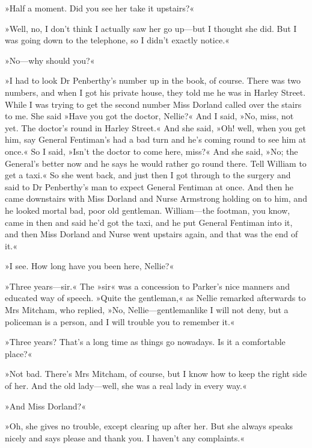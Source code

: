 »Half a moment. Did you see her take it upstairs?«

»Well, no, I don't think I actually saw her go up\allowbreak---\allowbreak but I thought she did. But I was going down to the telephone, so I didn't exactly notice.«

»No\allowbreak---\allowbreak why should you?«

»I had to look Dr Penberthy's number up in the book, of course. There was two numbers, and when I got his private house, they told me he was in Harley Street. While I was trying to get the second number Miss Dorland called over the stairs to me. She said »Have you got the doctor, Nellie?« And I said, »No, miss, not yet. The doctor's round in Harley Street.« And she said, »Oh! well, when you get him, say General Fentiman's had a bad turn and he's coming round to see him at once.« So I said, »Isn't the doctor to come here, miss?« And she said, »No; the General's better now and he says he would rather go round there. Tell William to get a taxi.« So she went back, and just then I got through to the surgery and said to Dr Penberthy's man to expect General Fentiman at once. And then he came downstairs with Miss Dorland and Nurse Armstrong holding on to him, and he looked mortal bad, poor old gentleman. William\allowbreak---\allowbreak the footman, you know, came in then and said he'd got the taxi, and he put General Fentiman into it, and then Miss Dorland and Nurse went upstairs again, and that was the end of it.«

»I see. How long have you been here, Nellie?«

»Three years\allowbreak---\allowbreak sir.« The »sir« was a concession to Parker's nice manners and educated way of speech. »Quite the gentleman,« as Nellie remarked afterwards to Mrs Mitcham, who replied, »No, Nellie\allowbreak---\allowbreak gentlemanlike I will not deny, but a policeman is a person, and I will trouble you to remember it.«

»Three years? That's a long time as things go nowadays. Is it a comfortable place?«

»Not bad. There's Mrs Mitcham, of course, but I know how to keep the right side of her. And the old lady\allowbreak---\allowbreak well, she was a real lady in every way.«

»And Miss Dorland?«

»Oh, she gives no trouble, except clearing up after her. But she always speaks nicely and says please and thank you. I haven't any complaints.«


